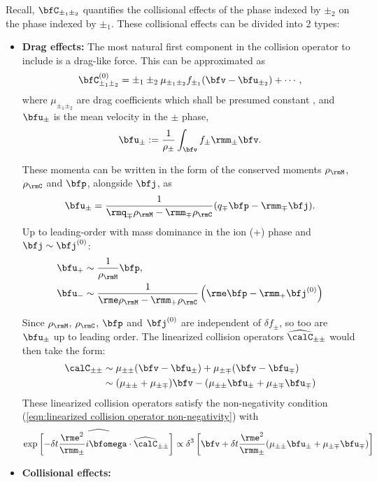     Recall, $\bfC_{\pm_{1}\pm_{2}}$ quantifies the collisional effects of the phase indexed by $\pm_{2}$ on the phase indexed by $\pm_{1}$. These collisional effects can be divided into 2 types:
    \begin{itemize}
        \item  {\bf Drag effects:} The most natural first component in the collision operator to include is a drag-like force. This can be approximated as
        \begin{equation}
            \bfC_{\pm_{1}\pm_{2}}^{(0)}  =  \pm_{1}\pm_{2}\mu_{\pm_{1}\pm_{2}}f_{\pm_{1}}(\bfv - \bfu_{\pm_{2}}) + \cdots,
        \end{equation}
        where $\mu_{\pm_{1}\pm_{2}}$ are drag coefficients which shall be presumed constant , and $\bfu_{\pm}$ is the mean velocity in the $\pm$ phase,
        \begin{equation}
            \bfu_{\pm}  :=  \frac{1}{\rho_{\pm}}\int_{\bfv}f_{\pm}\rmm_{\pm}\bfv.
        \end{equation}

        These momenta can be written in the form of the conserved moments $\rho_{\rmM}$, $\rho_{\rmC}$ and $\bfp$, alongside $\bfj$, as
        \begin{equation}
            \bfu_{\pm}  =  \frac{1}{\rmq_{\mp}\rho_{\rmM} - \rmm_{\mp}\rho_{\rmC}}(q_{\mp}\bfp - \rmm_{\mp}\bfj).
        \end{equation}
        Up to leading-order with mass dominance in the ion (+) phase and $\bfj  \sim  \bfj^{(0)}$:
        \begin{align}
            \bfu_{+}  &\sim  \frac{1}{\rho_{\rmM}}\bfp,  \\
            \bfu_{-}  &\sim  \frac{1}{\rme\rho_{\rmM} - \rmm_{+}\rho_{\rmC}}\left(\rme\bfp - \rmm_{+}\bfj^{(0)}\right)
        \end{align}

        Since $\rho_{\rmM}$, $\rho_{\rmC}$, $\bfp$ and $\bfj^{(0)}$ are independent of $\delta\!f_{\pm}$, so too are $\bfu_{\pm}$ up to leading order. The linearized collision operators $\widehat{\calC}_{\pm\pm}$ would then take the form:
        \begin{align}
            \calC_{\pm\pm}  &\sim  \mu_{\pm\pm}(\bfv - \bfu_{\pm}) + \mu_{\pm\mp}(\bfv - \bfu_{\mp})  \\
                            &\sim  (\mu_{\pm\pm} + \mu_{\pm\mp})\bfv - (\mu_{\pm\pm}\bfu_{\pm} + \mu_{\pm\mp}\bfu_{\mp})
        \end{align}
        These linearized collision operators satisfy the non-negativity condition (\ref{eqn:linearized collision operator non-negativity}) with
        \begin{equation}
            \widehat{\exp\left[- \delta t\frac{\rme^{2}}{\rmm_{\pm}}i\bfomega\cdot\widehat{\calC}_{\pm\pm}\right]}  \propto  \delta^{3}\left[\bfv + \delta t\frac{\rme^{2}}{\rmm_{\pm}}(\mu_{\pm\pm}\bfu_{\pm} + \mu_{\pm\mp}\bfu_{\mp})\right]
        \end{equation}

        \item {\bf Collisional effects:}
    \end{itemize}

